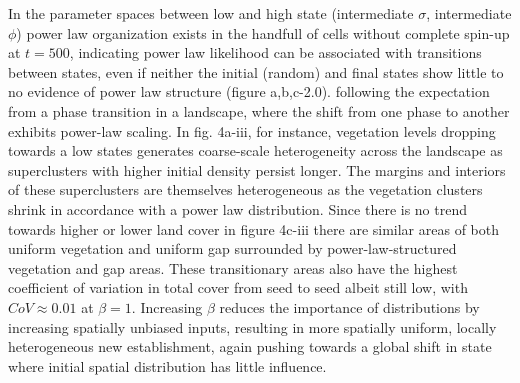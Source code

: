 \documentclass[10pt]{article}
\begin{document}
\begin{linenumbers}
In the parameter spaces between low and high state (intermediate $\sigma$, intermediate $\phi$) power law organization exists in the handfull of cells without complete spin-up at $t = 500$, indicating power law likelihood can be associated with transitions between states, even if neither the initial (random) and final states show little to no evidence of power law structure (figure a,b,c-2.0). following the expectation from a phase transition in a landscape, where the shift from one phase to another exhibits power-law scaling. In fig. 4a-iii, for instance, vegetation levels dropping towards a low states generates coarse-scale heterogeneity across the landscape as superclusters with higher initial density persist longer. The margins and interiors of these superclusters are themselves heterogeneous as the vegetation clusters shrink in accordance with a power law distribution. Since there is no trend towards higher or lower land cover in figure 4c-iii there are similar areas of both uniform vegetation and uniform gap surrounded by power-law-structured vegetation and gap areas. These transitionary areas also have the highest coefficient of variation in total cover from seed to seed albeit still low, with $CoV \approx 0.01$ at $\beta = 1$. Increasing $\beta$ reduces the importance of distributions by increasing spatially unbiased inputs, resulting in more spatially uniform, locally heterogeneous new establishment, again pushing towards a global shift in state where initial spatial distribution has little influence.


\end{linenumbers}
\end{document}
